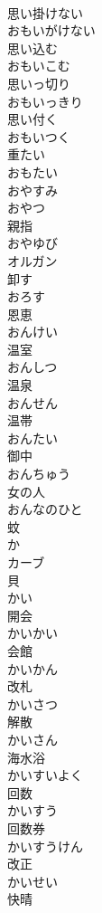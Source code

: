 \documentclass[8pt]{extreport}
\begin{document}
\begin{CJK}{UTF8}{min}
\\	思い掛けない 
\\	おもいがけない	
\\	思い込む 
\\	おもいこむ	
\\	思いっ切り 
\\	おもいっきり	
\\	思い付く 
\\	おもいつく	
\\	重たい 
\\	おもたい	
\\	おやすみ	
\\	おやつ	
\\	親指 
\\	おやゆび	
\\	オルガン	
\\	卸す 
\\	おろす	
\\	恩恵 
\\	おんけい	
\\	温室 
\\	おんしつ	
\\	温泉 
\\	おんせん	
\\	温帯 
\\	おんたい	
\\	御中 
\\	おんちゅう	
\\	女の人 
\\	おんなのひと	
\\	蚊 
\\	か	
\\	カーブ	
\\	貝 
\\	かい	
\\	開会 
\\	かいかい	
\\	会館 
\\	かいかん	
\\	改札 
\\	かいさつ	
\\	解散 
\\	かいさん	
\\	海水浴 
\\	かいすいよく	
\\	回数 
\\	かいすう	
\\	回数券 
\\	かいすうけん	
\\	改正 
\\	かいせい	
\\	快晴 

\end{CJK}
\end{document}
